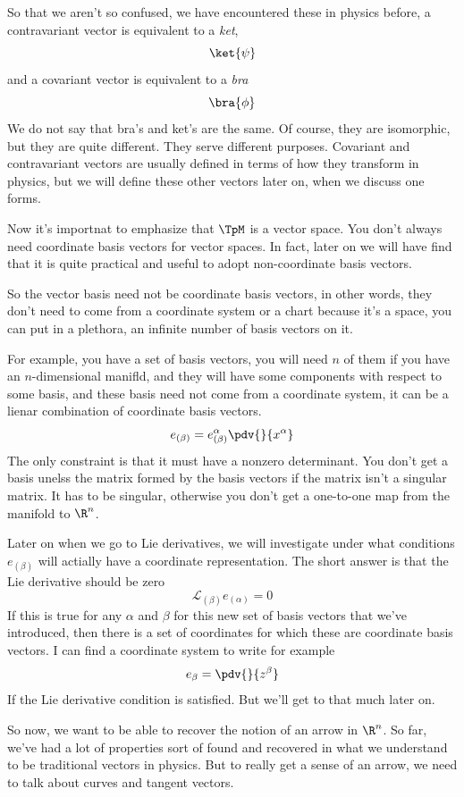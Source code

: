So that we aren't so confused, we have encountered these in physics before, a contravariant vector is equivalent to a \textit{ket},
\[
	\ket{\psi}
\]
and a covariant vector is equivalent to a \textit{bra}
\[
	\bra{\phi}
\]
We do not say that bra's and ket's are the same. Of course, they are isomorphic, but they
are quite different. They serve different purposes. 
Covariant and contravariant vectors are usually defined in terms of how they
transform in physics, but we will define these other vectors later on, when we discuss one forms.

Now it's importnat to emphasize that $\TpM$ is a vector space. You don't always need coordinate basis vectors for vector spaces.
In fact, later on we will have find that it is quite practical and useful to adopt non-coordinate basis vectors. 

So the vector basis need not be coordinate basis vectors, in other words, they don't need to come from a coordinate system or a chart 
because it's a space, you can put in a plethora, an infinite number of basis vectors on it. 

For example, you have a set of basis vectors, you will need $n$ of them if you have an $n$-dimensional manifld, and
they will have some components with respect to some basis, and these basis need not come from 
a coordinate system, it can be a lienar combination of coordinate basis vectors.
\[
	e_{(\beta)} = e_{(\beta)}^\alpha \pdv{}{x^\alpha} 
\]
The only constraint is 
that it must have a nonzero determinant. You don't get a basis unelss the matrix formed by the basis vectors if 
the matrix isn't a singular matrix. It has to be singular, otherwise you don't get a one-to-one map from the manifold to $\R^n$.

Later on when we go to Lie derivatives, we will investigate under what conditions $e_{(\beta)}$ will actially have a coordinate representation.
The short answer is that the Lie derivative should be zero
\[
	\mathscr{L}_{(\beta)} e_{(\alpha)} = 0
\]
If this is true for any $\alpha$ and $\beta$ for this new set of basis vectors that we've introduced, then 
there is a set of coordinates for which these are coordinate basis vectors. I can find a coordinate system to write
for example
\[
	e_{\beta} = \pdv{}{z^\beta} 
\]
If the Lie derivative condition is satisfied. But we'll get to that much later on. 

So now, we want to be able to recover the notion of an arrow in $\R^n$. So far, we've had a lot of properties 
sort of found and recovered in what we understand to be traditional vectors in physics. But to really get 
a sense of an arrow, we need to talk about curves and tangent vectors.

